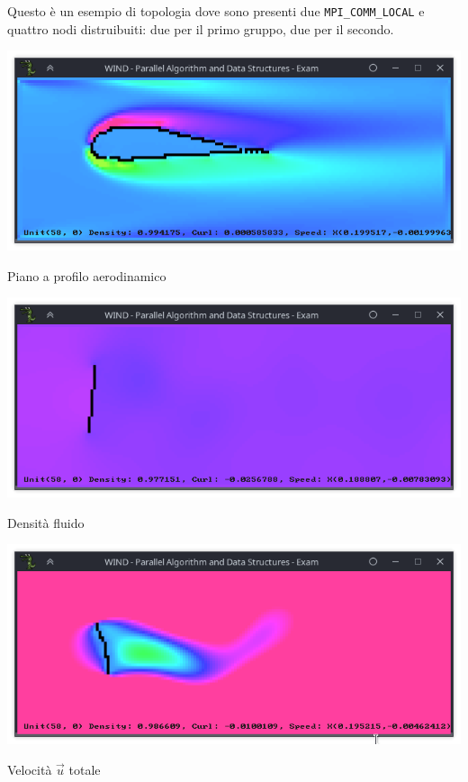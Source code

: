 \documentclass[12pt]{article}
\begin{document}
Questo è un esempio di topologia dove sono presenti due \verb|MPI_COMM_LOCAL| e quattro nodi distruibuiti: due per il primo gruppo, due per il secondo.



\begin{center}
    \centering
    \includegraphics[scale=0.75]{8}
    \caption{Piano a profilo aerodinamico}
    \label{fig:screen2}
\end{center}

\begin{center}
    \centering
    \includegraphics[scale=0.75]{9}
    \caption{Densità fluido}
    \label{fig:screen3}
\end{center}

\begin{center}
    \centering
    \includegraphics[scale=0.75]{10}
    \caption{Velocità \(\vec{u}\) totale}
    \label{fig:screen4}
\end{center}
\end{document}
